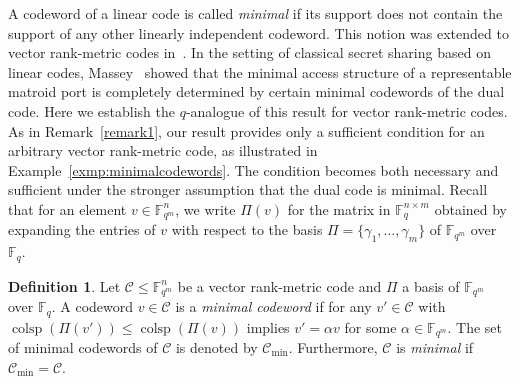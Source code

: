 \documentclass[onecolumn,draftclsnofoot,12pt]{IEEEtran}
\newcommand{\F}{\mathbb{F}}
\newcommand{\C}{\mathcal{C}}
\newcommand{\colsp}{\operatorname{colsp}}
\theoremstyle{plain} %
\theoremstyle{definition}
\newtheorem{definition}[theorem]{Definition}
\begin{document}
A codeword of a linear code is called \emph{minimal} if its support does not contain the support of any other linearly independent codeword. This notion was extended to vector rank-metric codes in~\cite{ALFARANO2022105658}. In the setting of classical secret sharing based on linear codes, Massey~\cite{Massey1999MinimalCA} showed that the minimal access structure of a representable matroid port is completely determined by certain minimal codewords of the dual code. Here we establish the $q$-analogue of this result for vector rank-metric codes. As in Remark~\ref{remark1}, our result provides only a sufficient condition for an arbitrary vector rank-metric code, as illustrated in Example~\ref{exmp:minimalcodewords}. The condition becomes both necessary and sufficient under the stronger assumption that the dual code is minimal. Recall that for an element $v \in \mathbb{F}_{q^{m}}^{n}$, we write $\Pi(v)$ for the matrix in $\mathbb{F}_{q}^{n \times m}$ obtained by expanding the entries of $v$ with respect to the basis $\Pi = \{\gamma_{1}, \ldots, \gamma_{m}\}$ of $\mathbb{F}_{q^{m}}$ over $\mathbb{F}_{q}$.


\begin{definition}
Let $\C\leq \F_{q^m}^n$ be a vector rank-metric code and $\Pi$ a basis of $\F_{q^m}$ over $\F_q$. A codeword $v\in \C$ is a \emph{minimal codeword} if for any $v'\in \C$ with $\colsp(\Pi(v')) \leq \colsp(\Pi(v))$ implies $v'=\alpha v$ for some $\alpha \in \F_{q^m}$. The set of minimal codewords of $\C$ is denoted by $\C_{\min}$. Furthermore, $\C$ is \emph{minimal} if $\C_{\min}=\C$. \label{def:rankmetricminimal}
\end{definition}
\end{document}
